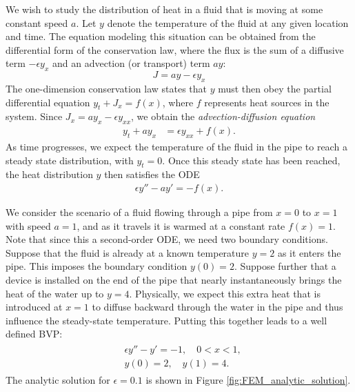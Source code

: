 
We wish to study the distribution of heat in a fluid that is moving at some constant speed $a$.
Let \(y\) denote the temperature of the fluid at any given location and time.
The equation modeling this situation can be obtained from the differential form of the conservation law, where the flux is the sum of a diffusive term \(-\epsilon y_x\) and an advection (or transport) term \(ay\):
\[
J = ay - \epsilon y_x
\]
The one-dimension conservation law states that \(y\) must then obey the partial differential equation \(
y_t + J_x = f(x)
\), where \(f\) represents heat sources in the system.
Since \(J_x = ay_x-\epsilon y_{xx}\), we obtain the \textit{advection-diffusion equation}
\begin{align*}
y_t+ay_x &=\epsilon y_{xx} +  f(x).
\end{align*}
As time progresses, we expect the temperature of the fluid in the pipe to reach a steady state distribution, with $y_t = 0$.
Once this steady state has been reached, the heat distribution \(y\) then satisfies the ODE
\begin{align*}
\epsilon y'' -ay' = -f(x).
\end{align*}

We consider the scenario of a fluid flowing through a pipe from $x = 0$ to $x = 1$ with  speed $a = 1$, and as it travels it is warmed at a constant rate $f(x)= 1$.
Note that since this a second-order ODE, we need two boundary conditions.
Suppose that the fluid is already at a known temperature \(y=2\) as it enters the pipe.
This imposes the boundary condition \(y(0)=2\).
Suppose further that a device is installed on the end of the pipe that nearly instantaneously brings the heat of the water up to $y = 4$.
Physically, we expect this extra heat that is introduced at $x = 1$ to diffuse backward through the water in the pipe and thus influence the steady-state temperature.
Putting this together leads to a well defined BVP:
\begin{align}
	\begin{split}
	&{ } \epsilon y'' - y' = -1, \quad 0 < x < 1, \\
	&{ } y(0) = 2, \quad y(1) = 4.
	\end{split}\label{eqn:FEM_steady_state}
\end{align}
The analytic solution for \(\epsilon=0.1\) is shown in Figure \ref{fig:FEM_analytic_solution}.

